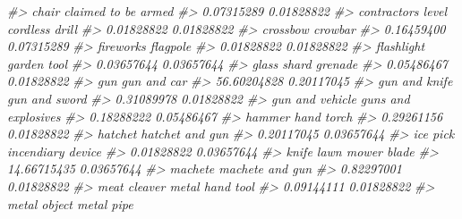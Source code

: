 \documentclass[
  12pt,
]{book}
\newenvironment{Shaded}{\begin{snugshade}}{\end{snugshade}}
\newcommand{\CommentTok}[1]{\textcolor[rgb]{0.56,0.35,0.01}{\textit{#1}}}
\begin{document}
\begin{Shaded}
\begin{Highlighting}[]
\CommentTok{\#>                            chair              claimed to be armed }
\CommentTok{\#>                       0.07315289                       0.01828822 }
\CommentTok{\#>               contractor\textquotesingle{}s level                   cordless drill }
\CommentTok{\#>                       0.01828822                       0.01828822 }
\CommentTok{\#>                         crossbow                          crowbar }
\CommentTok{\#>                       0.16459400                       0.07315289 }
\CommentTok{\#>                        fireworks                         flagpole }
\CommentTok{\#>                       0.01828822                       0.01828822 }
\CommentTok{\#>                       flashlight                      garden tool }
\CommentTok{\#>                       0.03657644                       0.03657644 }
\CommentTok{\#>                      glass shard                          grenade }
\CommentTok{\#>                       0.05486467                       0.01828822 }
\CommentTok{\#>                              gun                      gun and car }
\CommentTok{\#>                      56.60204828                       0.20117045 }
\CommentTok{\#>                    gun and knife                    gun and sword }
\CommentTok{\#>                       0.31089978                       0.01828822 }
\CommentTok{\#>                  gun and vehicle              guns and explosives }
\CommentTok{\#>                       0.18288222                       0.05486467 }
\CommentTok{\#>                           hammer                       hand torch }
\CommentTok{\#>                       0.29261156                       0.01828822 }
\CommentTok{\#>                          hatchet                  hatchet and gun }
\CommentTok{\#>                       0.20117045                       0.03657644 }
\CommentTok{\#>                         ice pick                incendiary device }
\CommentTok{\#>                       0.01828822                       0.03657644 }
\CommentTok{\#>                            knife                 lawn mower blade }
\CommentTok{\#>                      14.66715435                       0.03657644 }
\CommentTok{\#>                          machete                  machete and gun }
\CommentTok{\#>                       0.82297001                       0.01828822 }
\CommentTok{\#>                     meat cleaver                  metal hand tool }
\CommentTok{\#>                       0.09144111                       0.01828822 }
\CommentTok{\#>                     metal object                       metal pipe }

\end{Highlighting}
\end{Shaded}
\end{document}
